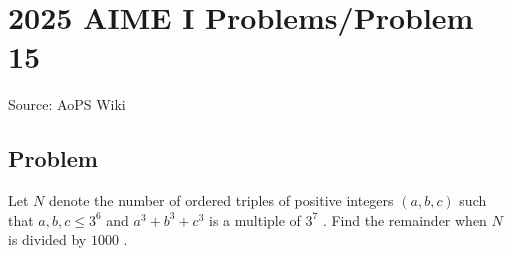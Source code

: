 \documentclass[12pt]{article}
\begin{document}
\section*{{2025 AIME I Problems/Problem 15}}
Source: AoPS Wiki

\subsection*{Problem}
Let $N$ denote the number of ordered triples of positive integers $(a, b, c)$ such that $a, b, c \leq 3^6$ and $a^3 + b^3 + c^3$ is a multiple of $3^7$ . Find the remainder when $N$ is divided by $1000$ .
\end{document}
